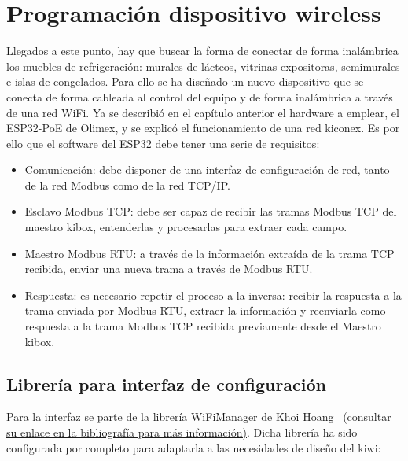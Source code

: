 \section{Programación dispositivo wireless}
\label{sec:programacionesp32}
Llegados a este punto, hay que buscar la forma de conectar de forma inalámbrica los muebles de refrigeración: murales de lácteos, vitrinas expositoras, semimurales e islas de congelados. Para ello se ha diseñado un nuevo dispositivo que se conecta de forma cableada al control del equipo y de forma inalámbrica a través de una red WiFi. Ya se describió en el capítulo anterior el hardware a emplear, el ESP32-PoE de Olimex, y se explicó el funcionamiento de una red kiconex. Es por ello que el software del ESP32 debe tener una serie de requisitos:

\begin{itemize}
  \item Comunicación: debe disponer de una interfaz de configuración de red, tanto de la red Modbus como de la red TCP/IP.
  \item Esclavo Modbus TCP: debe ser capaz de recibir las tramas Modbus TCP del maestro kibox, entenderlas y procesarlas para extraer cada campo.
  \item Maestro Modbus RTU: a través de la información extraída de la trama TCP recibida, enviar una nueva trama a través de Modbus RTU.
  \item Respuesta: es necesario repetir el proceso a la inversa: recibir la respuesta a la trama enviada por Modbus RTU, extraer la información y reenviarla como respuesta a la trama Modbus TCP recibida previamente desde el Maestro kibox.
\end{itemize}

\subsection{Librería para interfaz de configuración}
\label{subsec:interfazKiwi}
Para la interfaz se parte de la librería WiFiManager de Khoi Hoang~\cite{libreriaWiFigithub} \href{https://github.com/khoih-prog/ESP_WiFiManager}{(consultar su enlace en la bibliografía para más información)}. Dicha librería ha sido configurada por completo para adaptarla a las necesidades de diseño del kiwi:

